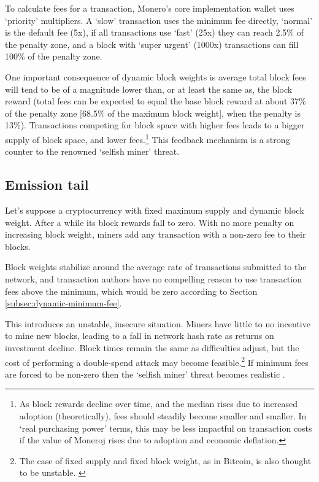 To calculate fees for a transaction, Monero's core implementation wallet uses `priority' multipliers. A `slow' transaction uses the minimum fee directly, `normal' is the default fee (5x), if all transactions use `fast' (25x) they can reach 2.5\% of the penalty zone, and a block with `super urgent' (1000x) transactions can fill 100\% of the penalty zone.%

One important consequence of dynamic block weights is average total block fees will tend to be of a magnitude lower than, or at least the same as, the block reward (total fees can be expected to equal the base block reward at about 37\% of the penalty zone [68.5\% of the maximum block weight], when the penalty is 13\%). Transactions competing for block space with higher fees leads to a bigger supply of block space, and lower fees.\footnote{As block rewards decline over time, and the median rises due to increased adoption (theoretically), fees should steadily become smaller and smaller. In `real purchasing power' terms, this may be less impactful on transaction costs if the value of Moneroj rises due to adoption and economic deflation.} This feedback mechanism is a strong counter to the renowned `selfish miner' \cite{selfish-miner} threat.


\subsection{Emission tail}
\label{subsec:emission-tail}

Let's suppose a cryptocurrency with fixed maximum supply and dynamic block weight. After a while its block rewards fall to zero. With no more penalty on increasing block weight, miners add any transaction with a non-zero fee to their blocks.

Block weights stabilize around the average rate of transactions submitted to the network, and transaction authors have no compelling reason to use transaction fees above the minimum, which would be zero according to Section \ref{subsec:dynamic-minimum-fee}.

This introduces an unstable, insecure situation. Miners have little to no incentive to mine new blocks, leading to a fall in network hash rate as returns on investment decline. Block times remain the same as difficulties adjust, but the cost of performing a double-spend attack may become feasible.\footnote{The case of fixed supply and fixed block weight, as in Bitcoin, is also thought to be unstable. \cite{no-reward-instability}} If minimum fees are forced to be non-zero then the `selfish miner' \cite{selfish-miner} threat becomes realistic  \cite{no-reward-instability}.\\

